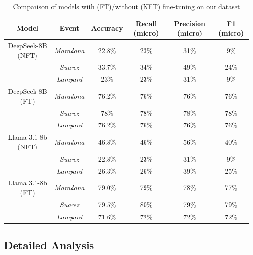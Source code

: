 \documentclass[sigconf, review]{acmart}
\begin{document}

\begin{table}[htbp]
    \centering
    \footnotesize %
    \setlength{\tabcolsep}{2pt} %
    \renewcommand{\arraystretch}{0.8} %
    \begin{tabular}{|c|c|c|c|c|c|}
        \hline
        \textbf{Model} & \textbf{Event} & \textbf{Accuracy} & \textbf{Recall (micro)} & \textbf{Precision (micro)} & \textbf{F1 (micro)} \\
         \hline
         DeepSeek-8B (NFT) & \textit{Maradona} & 22.8\% & 23\% & 31\% & 9\% \\
         & \textit{Suarez} & 33.7\% & 34\% & 49\% & 24\% \\
         & \textit{Lampard} & 23\% & 23\% & 31\% & 9\% \\
          \hline
        DeepSeek-8B (FT) & \textit{Maradona} & 76.2\% & 76\% & 76\% & 76\% \\
         & \textit{Suarez} & 78\% & 78\% & 78\% & 78\% \\
         & \textit{Lampard} & 76.2\% & 76\% & 76\% & 76\% \\
        \hline
        Llama 3.1-8b (NFT) & \textit{Maradona} & 46.8\% & 46\% & 56\% & 40\% \\
         & \textit{Suarez} & 22.8\% & 23\% & 31\% & 9\% \\
         & \textit{Lampard} & 26.3\% & 26\% & 39\% & 25\% \\
         \hline
        Llama 3.1-8b (FT) & \textit{Maradona} & 79.0\% & 79\% & 78\% & 77\% \\
         & \textit{Suarez} & 79.5\% & 80\% & 79\% & 79\% \\
         & \textit{Lampard} & 71.6\% & 72\% & 72\% & 72\% \\
        \hline
    \end{tabular}
    \caption{Comparison of models with (FT)/without (NFT) fine-tuning on our dataset}
    \label{tab:student_info}
\end{table}
\vspace{5mm}





\subsection{Detailed Analysis}
\end{document}
